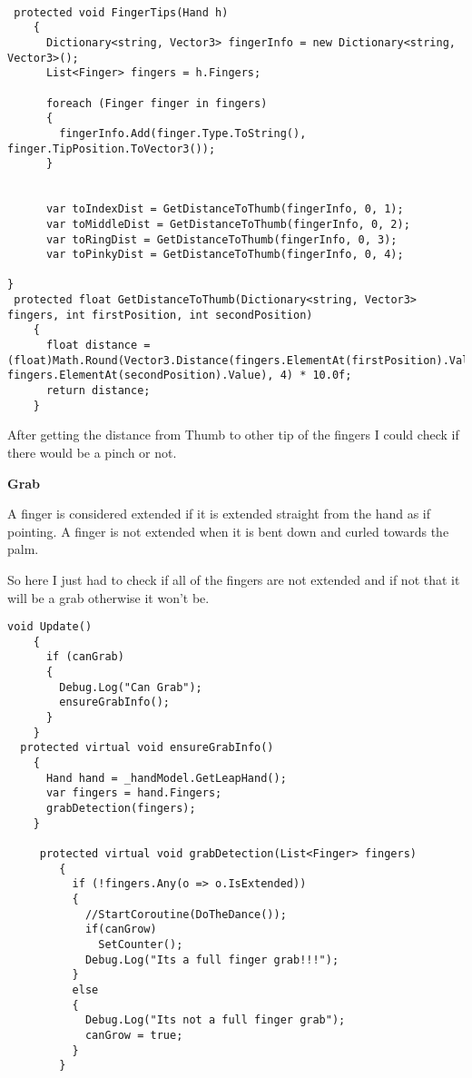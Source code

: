 {\begin{lstlisting}[caption= {Pinching detection in Kyno},label={pinch}]

 protected void FingerTips(Hand h)
    {
      Dictionary<string, Vector3> fingerInfo = new Dictionary<string, Vector3>();
      List<Finger> fingers = h.Fingers;

      foreach (Finger finger in fingers)
      {
        fingerInfo.Add(finger.Type.ToString(), finger.TipPosition.ToVector3());
      }


      var toIndexDist = GetDistanceToThumb(fingerInfo, 0, 1);
      var toMiddleDist = GetDistanceToThumb(fingerInfo, 0, 2);
      var toRingDist = GetDistanceToThumb(fingerInfo, 0, 3);
      var toPinkyDist = GetDistanceToThumb(fingerInfo, 0, 4);
      
}
 protected float GetDistanceToThumb(Dictionary<string, Vector3> fingers, int firstPosition, int secondPosition)
    {
      float distance = (float)Math.Round(Vector3.Distance(fingers.ElementAt(firstPosition).Value, fingers.ElementAt(secondPosition).Value), 4) * 10.0f;
      return distance;
    }
\end{lstlisting}

After getting the distance from Thumb to other tip of the fingers I could check if there would be a pinch or not.

\textbf{Grab}

A finger is considered extended if it is extended straight from the hand as if pointing. A finger is not extended when it is bent down and curled towards the palm.

So here I just had to check if all of the fingers are not extended and if not that it will be a grab otherwise it won't be.
\begin{lstlisting}[caption={Grab detection in Kyno},label={createController}]
 void Update()
    {
      if (canGrab)
      {
        Debug.Log("Can Grab");
        ensureGrabInfo();
      }
    }
  protected virtual void ensureGrabInfo()
    {
      Hand hand = _handModel.GetLeapHand();
      var fingers = hand.Fingers;
      grabDetection(fingers);
    }
    
     protected virtual void grabDetection(List<Finger> fingers)
        {
          if (!fingers.Any(o => o.IsExtended))
          {
            //StartCoroutine(DoTheDance());
            if(canGrow)
              SetCounter();
            Debug.Log("Its a full finger grab!!!");
          }
          else
          {
            Debug.Log("Its not a full finger grab");
            canGrow = true;
          }
        }
\end{lstlisting}


}
